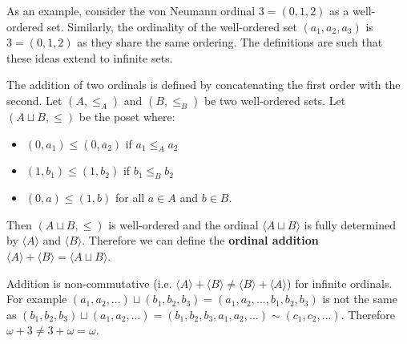 \documentclass{article}
\newcommand{\marginleft}[1] {\reversemarginpar\marginpar{#1}}
\def\ordeq{\sim}
\begin{document}
\begin{remark}
	As an example, consider the von Neumann ordinal $3 = (0, 1, 2)$ as a well-ordered set. Similarly, the ordinality of the well-ordered set $(a_1, a_2, a_3)$ is $3 = (0, 1, 2)$ as they share the same ordering. The definitions are such that these ideas extend to infinite sets.
\end{remark}

\begin{defn}
	The addition \marginleft{Ordinal addition: $\langle A \rangle + \langle B \rangle$} of two ordinals is defined by concatenating the first order with the second. Let $(A, \leq_A)$ and $(B, \leq_B)$ be two well-ordered sets. Let $(A \sqcup B, \leq)$ be the poset where:
	\begin{itemize}
		\item $(0, a_1) \leq (0, a_2)$ if $a_1 \leq_A a_2$
		\item $(1, b_1) \leq (1, b_2)$ if $b_1 \leq_B b_2$
		\item $(0, a) \leq (1, b)$ for all $a \in A$ and $b \in B$.  	
	\end{itemize}
	Then $(A \sqcup B, \leq)$ is well-ordered and the ordinal $\langle A \sqcup B \rangle$ is fully determined by $\langle A \rangle$ and $\langle B \rangle$. Therefore we can define the \textbf{ordinal addition} $\langle A \rangle + \langle B \rangle =  \langle A \sqcup B \rangle$.
\end{defn}


\begin{remark}
	Addition is non-commutative (i.e. $\langle A \rangle + \langle B \rangle \neq \langle B \rangle + \langle A \rangle$) for infinite ordinals. For example $(a_1, a_2, ...) \sqcup (b_1, b_2, b_3) = (a_1, a_2, ..., b_1, b_2, b_3)$ is not the same as $(b_1, b_2, b_3) \sqcup (a_1, a_2, ...) = (b_1, b_2, b_3, a_1, a_2, ...) \ordeq (c_1, c_2, ...)$. Therefore $\omega + 3 \neq 3 + \omega = \omega$.
\end{remark}
\end{document}
